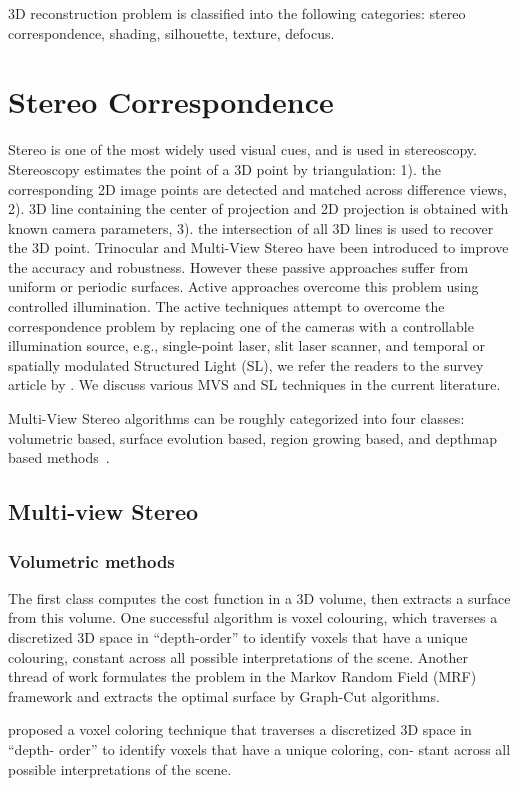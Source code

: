 3D reconstruction problem is classified into the following categories: stereo correspondence, shading, silhouette, texture, defocus.

\section{Stereo Correspondence}
Stereo is one of the most widely used visual cues, and is used in stereoscopy. Stereoscopy estimates the point of a 3D point by triangulation: 1). the corresponding 2D image points are detected and matched across difference views, 2). 3D line containing the center of projection and 2D projection is obtained with known camera parameters, 3). the intersection of all 3D lines is used to recover the 3D point. Trinocular and Multi-View Stereo have been introduced to improve the accuracy and robustness. However these passive approaches suffer from uniform or periodic surfaces. Active approaches overcome this problem using controlled illumination. The active techniques attempt to overcome the correspondence problem by replacing one of the cameras with a controllable illumination source, e.g., single-point laser, slit laser scanner, and temporal or spatially modulated Structured Light (SL), we refer the readers to the survey article by \citeauthor{blais2004review}. We discuss various MVS and SL techniques in the current literature.

Multi-View Stereo algorithms can be roughly categorized into four classes: volumetric based, surface evolution based, region growing based, and depthmap based methods~\cite{seitz2006comparison}.

\subsection{Multi-view Stereo}
\subsubsection{Volumetric methods}
The first class computes the cost function in a 3D volume, then extracts a surface from this volume. One successful algorithm is voxel colouring, which traverses a discretized 3D space in “depth-order” to identify voxels that have a unique colouring, constant across all possible interpretations of the scene. Another thread of work formulates the problem in the Markov Random Field (MRF) framework and extracts the optimal surface by Graph-Cut algorithms.

\citeauthor{seitz2006comparison} proposed a voxel coloring technique that traverses a discretized 3D space in “depth- order” to identify voxels that have a unique coloring, con- stant across all possible interpretations of the scene.

